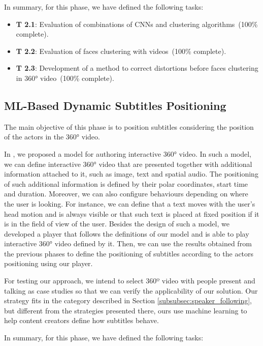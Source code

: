 In summary, for this phase, we have defined the following tasks:


\begin{itemize}
    \item \textbf{T 2.1}: Evaluation of combinations of CNNs and clustering algorithms~(100\% complete).
    \item \textbf{T 2.2}: Evaluation of faces clustering with videos~(100\% complete).
    \item \textbf{T 2.3}: Development of a method to correct distortions before faces clustering in 360° video~(100\% complete).
\end{itemize}


\subsection{ML-Based Dynamic Subtitles Positioning}

The main objective of this phase is to position subtitles considering the position of the actors in the 360° video.

In \cite{mendes_2020}, we proposed a model for authoring interactive 360° video. In such a model, we can define interactive 360° video that are presented together with additional information attached to it, such as image, text and spatial audio. The positioning of such additional information is defined by their polar coordinates, start time and duration. Moreover, we can also configure behaviours depending on where the user is looking. For instance, we can define that a text moves with the user's head motion and is always visible or that such text is placed at fixed position if it is in the field of view of the user. Besides the design of such a model, we developed a player that follows the definitions of our model and is able to play interactive 360° video defined by it. Then, we can use the results obtained from the previous phases to define the positioning of subtitles according to the actors positioning using our player.

For testing our approach, we intend to select 360º video with people present and talking as case studies so that we can verify the applicability of our solution. Our strategy fits in the category described in Section \ref{subsubsec:speaker_following}, but different from the strategies presented there, ours use machine learning to help content creators define how subtitles behave.

In summary, for this phase, we have defined the following tasks:

